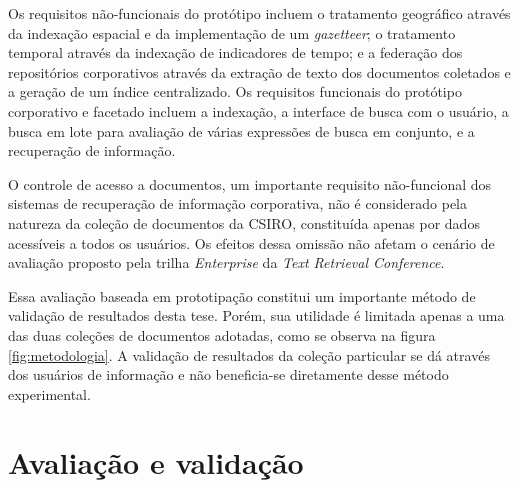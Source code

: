 Os requisitos não-funcionais do protótipo incluem o tratamento geográfico através da indexação espacial e da implementação de um \textit{gazetteer}; o tratamento temporal através da indexação de indicadores de tempo; e a federação dos repositórios corporativos através da extração de texto dos documentos coletados e a geração de um índice centralizado. Os requisitos funcionais do protótipo corporativo e facetado incluem a indexação, a interface de busca com o usuário, a busca em lote para avaliação de várias expressões de busca em conjunto, e a recuperação de informação.

O controle de acesso a documentos, um importante requisito não-funcional dos sistemas de recuperação de informação corporativa, não é considerado pela natureza da coleção de documentos da CSIRO, constituída apenas por dados acessíveis a todos os usuários. Os efeitos dessa omissão não afetam o cenário de avaliação proposto pela trilha \textit{Enterprise} da \textit{Text Retrieval Conference}. %

Essa avaliação baseada em prototipação constitui um importante método de validação de resultados desta tese. Porém, sua utilidade é limitada apenas a uma das duas coleções de documentos adotadas, como se observa na figura \ref{fig:metodologia}. A validação de resultados da coleção particular se dá através dos usuários de informação e não beneficia-se diretamente desse método experimental.





\section{Avaliação e validação}

